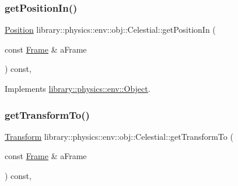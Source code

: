 \mbox{\label{classlibrary_1_1physics_1_1env_1_1obj_1_1_celestial_a3b5b5b5e1f0749345afc5e6cead6e86e}} 
\subsubsection{\texorpdfstring{get\+Position\+In()}{getPositionIn()}}
{\footnotesize\ttfamily \hyperlink{classlibrary_1_1physics_1_1coord_1_1_position}{Position} library\+::physics\+::env\+::obj\+::\+Celestial\+::get\+Position\+In (\begin{DoxyParamCaption}\item[{const \hyperlink{classlibrary_1_1physics_1_1coord_1_1_frame}{Frame} \&}]{a\+Frame }\end{DoxyParamCaption}) const\hspace{0.3cm}{\ttfamily [override]}, {\ttfamily [virtual]}}



Implements \hyperlink{classlibrary_1_1physics_1_1env_1_1_object_ad9c15bf11720fc7432f2c0fa3490531b}{library\+::physics\+::env\+::\+Object}.

\mbox{\label{classlibrary_1_1physics_1_1env_1_1obj_1_1_celestial_aa8efdcb1d3e0f51be20291a74ca1fdc7}} 
\subsubsection{\texorpdfstring{get\+Transform\+To()}{getTransformTo()}}
{\footnotesize\ttfamily \hyperlink{classlibrary_1_1physics_1_1coord_1_1_transform}{Transform} library\+::physics\+::env\+::obj\+::\+Celestial\+::get\+Transform\+To (\begin{DoxyParamCaption}\item[{const \hyperlink{classlibrary_1_1physics_1_1coord_1_1_frame}{Frame} \&}]{a\+Frame }\end{DoxyParamCaption}) const\hspace{0.3cm}{\ttfamily [override]}, {\ttfamily [virtual]}}




